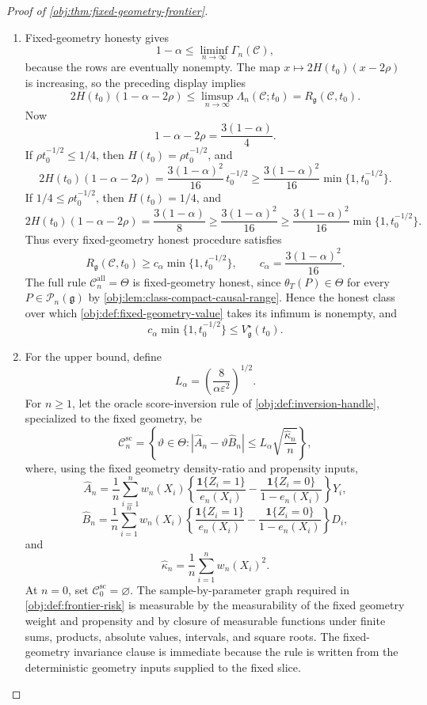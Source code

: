 \documentclass[11pt]{article}
\begin{document}
\begin{proof}[Proof of \cref{obj:thm:fixed-geometry-frontier}]
\begin{enumerate}
\item Fixed-geometry honesty gives
\[
1-\alpha
\le
\liminf_{n\to\infty}\Gamma_n(\mathscr C),
\]
because the rows are eventually nonempty.  The map \(x\mapsto 2H(t_0)(x-2\rho)\) is increasing, so the preceding display implies
\[
2H(t_0)(1-\alpha-2\rho)
\le
\limsup_{n\to\infty}\Lambda_n(\mathscr C;t_0)
=
R_{\mathfrak g}(\mathscr C,t_0).
\]
Now
\[
1-\alpha-2\rho=\frac{3(1-\alpha)}4 .
\]
If \(\rho t_0^{-1/2}\le1/4\), then \(H(t_0)=\rho t_0^{-1/2}\), and
\[
2H(t_0)(1-\alpha-2\rho)
=
\frac{3(1-\alpha)^2}{16}\,t_0^{-1/2}
\ge
\frac{3(1-\alpha)^2}{16}\min\{1,t_0^{-1/2}\}.
\]
If \(1/4\le\rho t_0^{-1/2}\), then \(H(t_0)=1/4\), and
\[
2H(t_0)(1-\alpha-2\rho)
=
\frac{3(1-\alpha)}8
\ge
\frac{3(1-\alpha)^2}{16}
\ge
\frac{3(1-\alpha)^2}{16}\min\{1,t_0^{-1/2}\}.
\]
Thus every fixed-geometry honest procedure satisfies
\[
R_{\mathfrak g}(\mathscr C,t_0)
\ge
c_\alpha\min\{1,t_0^{-1/2}\},
\qquad
c_\alpha=\frac{3(1-\alpha)^2}{16}.
\]
The full rule \(\mathscr C_n^{\mathrm{all}}=\Theta\) is fixed-geometry honest, since \(\theta_T(P)\in\Theta\) for every \(P\in\mathcal P_n(\mathfrak g)\) by \cref{obj:lem:class-compact-causal-range}.  Hence the honest class over which \cref{obj:def:fixed-geometry-value} takes its infimum is nonempty, and
\[
c_\alpha\min\{1,t_0^{-1/2}\}
\le
V_{\mathfrak g}^{\star}(t_0).
\]

\item For the upper bound, define
\[
L_\alpha=\left(\frac{8}{\alpha\varepsilon^2}\right)^{1/2}.
\]
For \(n\ge1\), let the oracle score-inversion rule of \cref{obj:def:inversion-handle}, specialized to the fixed geometry, be
\[
\mathscr C_n^{\mathrm{sc}}
=
\left\{\vartheta\in\Theta:
\left|\widehat A_n-\vartheta\widehat B_n\right|
\le
L_\alpha\sqrt{\frac{\widehat\kappa_n}{n}}
\right\},
\]
where, using the fixed geometry density-ratio and propensity inputs,
\[
\widehat A_n
=
\frac1n\sum_{i=1}^n
w_n(X_i)
\left\{\frac{\mathbf 1\{Z_i=1\}}{e_n(X_i)}
-
\frac{\mathbf 1\{Z_i=0\}}{1-e_n(X_i)}
\right\}Y_i,
\]
\[
\widehat B_n
=
\frac1n\sum_{i=1}^n
w_n(X_i)
\left\{\frac{\mathbf 1\{Z_i=1\}}{e_n(X_i)}
-
\frac{\mathbf 1\{Z_i=0\}}{1-e_n(X_i)}
\right\}D_i,
\]
and
\[
\widehat\kappa_n
=
\frac1n\sum_{i=1}^n w_n(X_i)^2 .
\]
At \(n=0\), set \(\mathscr C_0^{\mathrm{sc}}=\varnothing\).  The sample-by-parameter graph required in \cref{obj:def:frontier-risk} is measurable by the measurability of the fixed geometry weight and propensity and by closure of measurable functions under finite sums, products, absolute values, intervals, and square roots.  The fixed-geometry invariance clause is immediate because the rule is written from the deterministic geometry inputs supplied to the fixed slice.


\end{enumerate}
\end{proof}
\end{document}
